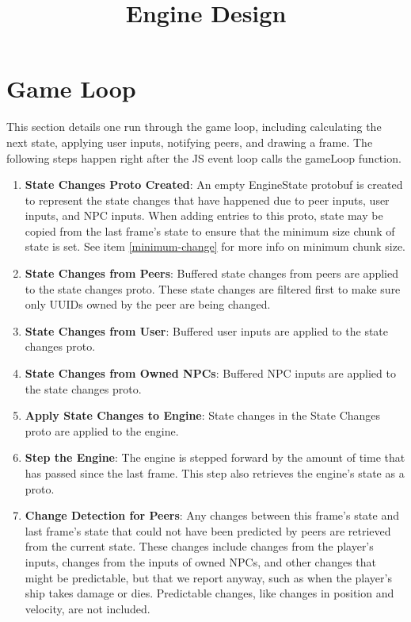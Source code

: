 \documentclass{article}
\title{Engine Design}
\begin{document}
\maketitle

\section{Game Loop}
This section details one run through the game loop, including calculating the next state, applying user inputs, notifying peers, and drawing a frame. The following steps happen right after the JS event loop calls the gameLoop function.
\begin{enumerate}
\item \textbf{State Changes Proto Created}: An empty EngineState protobuf is created to represent the state changes that have happened due to peer inputs, user inputs, and NPC inputs. When adding entries to this proto, state may be copied from the last frame's state to ensure that the minimum size chunk of state is set. See item \ref{minimum-change} for more info on minimum chunk size.

\item \textbf{State Changes from Peers}: Buffered state changes from peers are applied to the state changes proto. These state changes are filtered first to make sure only UUIDs owned by the peer are being changed.
\item \textbf{State Changes from User}: Buffered user inputs are applied to the state changes proto.
\item \textbf{State Changes from Owned NPCs}: Buffered NPC inputs are applied to the state changes proto.
\item \textbf{Apply State Changes to Engine}: State changes in the State Changes proto are applied to the engine.
\item \textbf{Step the Engine}: The engine is stepped forward by the amount of time that has passed since the last frame. This step also retrieves the engine's state as a proto.
\item \label{minimum-change} \textbf{Change Detection for Peers}: Any changes between this frame's state and last frame's state that could not have been predicted by peers are retrieved from the current state. These changes include changes from the player's inputs, changes from the inputs of owned NPCs, and other changes that might be predictable, but that we report anyway, such as when the player's ship takes damage or dies. Predictable changes, like changes in position and velocity, are not included.


\end{enumerate}
\end{document}
